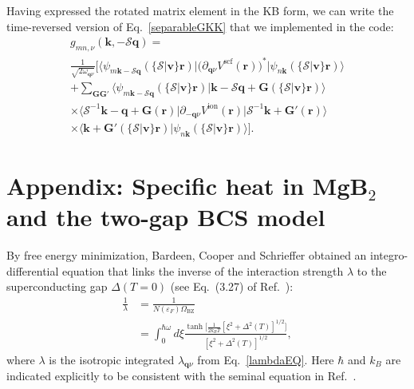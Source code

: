 \documentclass[final,3p,times,twocolumn]{elsarticle}
\begin{document}
Having expressed the rotated matrix element in the KB form, we can write the time-reversed version of Eq.~\eqref{separableGKK} that we implemented in the code:
\begin{multline}\label{separableGKKreversal}
	g_{mn,\nu}(\mathbf{k,-\mathcal{S}q}) = \\
	 \frac{1}{\sqrt{2\omega_{\mathbf{q}\nu}}}\Big[ \big\langle \psi_{m\mathbf{k-\mathcal{S}q}}(\{\mathcal{S}|\mathbf{v}\}\mathbf{r}) \big| \Big(\partial_{\mathbf{q}\nu}V^{\text{scf}} (\mathbf{r}) \Big)^* \big|  \psi_{n\mathbf{k}}(\{\mathcal{S}|\mathbf{v}\}\mathbf{r}) \big\rangle  \\
	+  \sum_{\mathbf{G}\mathbf{G'}} 
	\big\langle  \psi_{m\mathbf{k-\mathcal{S}q}}(\{\mathcal{S} |\mathbf{v}\}\mathbf{r}) \big|  \mathbf{k}- \mathcal{S}\mathbf{q} +\mathbf{G}(\{\mathcal{S} |\mathbf{v}\}\mathbf{r})\big\rangle  \\
	 \times \big\langle \mathcal{S}^{-1}\mathbf{k}-\mathbf{q}+\mathbf{G}(\mathbf{r})  \big| \partial_{-\mathbf{q}\nu}V^{\text{ion}} (\mathbf{r}) \big|   \mathcal{S}^{-1}\mathbf{k}+\mathbf{G}'(\mathbf{r})   \big\rangle \\
	  \times \big\langle \mathbf{k} +\mathbf{G}' (\{\mathcal{S} |\mathbf{v}\}\mathbf{r})  \big| \psi_{n\mathbf{k}}  (\{\mathcal{S}|\mathbf{v}\}\mathbf{r})  \big\rangle  \Big].
\end{multline}  



\section{Appendix: Specific heat in MgB$_2$ and the two-gap BCS model}
\label{Appendix2}

By free energy minimization, Bardeen, Cooper and Schrieffer obtained an integro-differential equation that links the inverse of the interaction strength $\lambda$ to the superconducting gap $\Delta(T=0)$ (see Eq.~(3.27) of Ref.~\cite{Bardeen1957}):
\begin{align}\label{BCS0}
\frac{1}{\lambda} &= \frac{1}{N(\varepsilon_F)\Omega_{\text{BZ}}} \nonumber \\
                  &= \int_0^{\hbar\omega}d\xi \frac{\tanh\Big[\frac{1}{2k_B T}[\xi^2+\Delta^2(T)]^{1/2}\Big]}{[\xi^2+\Delta^2(T)]^{1/2}},
\end{align}
where $\lambda$ is the isotropic integrated $\lambda_{\mathbf{q}\nu}$ from Eq.~\eqref{lambdaEQ}.
Here $\hbar$ and $k_B$ are indicated explicitly to be consistent with the seminal equation in Ref.~\cite{Bardeen1957}.
\end{document}
